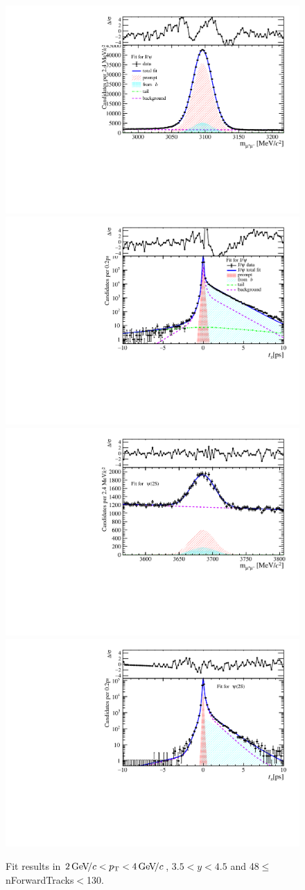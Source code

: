 \begin{figure}[H]
\begin{center}
\includegraphics[width=0.47\linewidth]{pdf/Jpsi/drawmassF/n5y3pt2.pdf}
\includegraphics[width=0.47\linewidth]{pdf/Jpsi/2DFitF/n5y3pt2.pdf}
\vspace*{-0.5cm}
\includegraphics[width=0.47\linewidth]{pdf/Psi2S/drawmassF/n5y3pt2.pdf}
\includegraphics[width=0.47\linewidth]{pdf/Psi2S/2DFitF/n5y3pt2.pdf}
\vspace*{-0.5cm}
\end{center}
\caption{Fit results in $2\text{\,Ge\kern -0.1em V\!/}c<p_{\mathrm{T}}<4\text{\,Ge\kern -0.1em V\!/}c$, $3.5<y<4.5$ and 48$\leq$nForwardTracks$<$130.}
\label{Fitn5y3pt2}
\end{figure}
